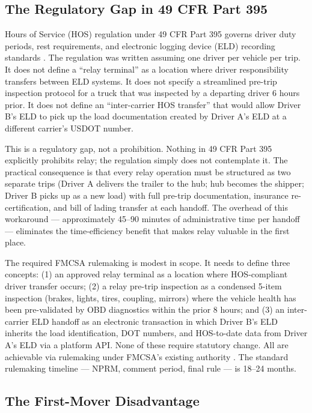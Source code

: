 \subsection{The Regulatory Gap in 49 CFR Part 395}

Hours of Service (HOS) regulation under 49 CFR Part 395 governs driver duty periods, rest requirements, and electronic logging device (ELD) recording standards \citep{FMCSA_HOS2022}. The regulation was written assuming one driver per vehicle per trip. It does not define a ``relay terminal'' as a location where driver responsibility transfers between ELD systems. It does not specify a streamlined pre-trip inspection protocol for a truck that was inspected by a departing driver 6 hours prior. It does not define an ``inter-carrier HOS transfer'' that would allow Driver B's ELD to pick up the load documentation created by Driver A's ELD at a different carrier's USDOT number.

This is a regulatory gap, not a prohibition. Nothing in 49 CFR Part 395 explicitly prohibits relay; the regulation simply does not contemplate it. The practical consequence is that every relay operation must be structured as two separate trips (Driver A delivers the trailer to the hub; hub becomes the shipper; Driver B picks up as a new load) with full pre-trip documentation, insurance re-certification, and bill of lading transfer at each handoff. The overhead of this workaround --- approximately 45--90 minutes of administrative time per handoff --- eliminates the time-efficiency benefit that makes relay valuable in the first place.

The required FMCSA rulemaking is modest in scope. It needs to define three concepts: (1) an approved relay terminal as a location where HOS-compliant driver transfer occurs; (2) a relay pre-trip inspection as a condensed 5-item inspection (brakes, lights, tires, coupling, mirrors) where the vehicle health has been pre-validated by OBD diagnostics within the prior 8 hours; and (3) an inter-carrier ELD handoff as an electronic transaction in which Driver B's ELD inherits the load identification, DOT numbers, and HOS-to-date data from Driver A's ELD via a platform API. None of these require statutory change. All are achievable via rulemaking under FMCSA's existing authority \citep{FMCSA_HOS2022}. The standard rulemaking timeline --- NPRM, comment period, final rule --- is 18--24 months.

\subsection{The First-Mover Disadvantage}

